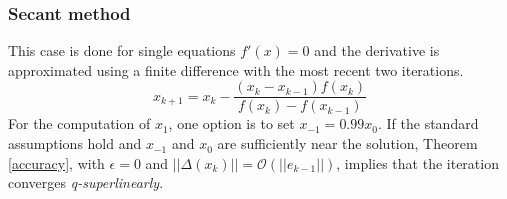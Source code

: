 \subsubsection{Secant method}This case is done for single equations $f'(x) = 0$ and the derivative is approximated using a finite difference with the most recent two iterations. 
\begin{equation}
{x}_{k+1} = {x}_{k} -\frac{({x}_{k}-{x}_{k-1}) f({x}_{k})}{f({x}_{k})-f({x}_{k-1})} 
\label{it_secant_method}
\end{equation} 
For the computation of ${x}_{1}$, one option is to set ${x}_{-1} = 0.99{x}_{0}$. If the standard assumptions hold and $ x_{-1} $ and $ x_0  $ are sufficiently near the solution, Theorem \ref{accuracy}, with $\epsilon = 0$ and $||\Delta(x_k)||=\mathcal{O}(||e_{k-1}||)$, implies that the iteration converges\textit{ q-superlinearly}.\\

